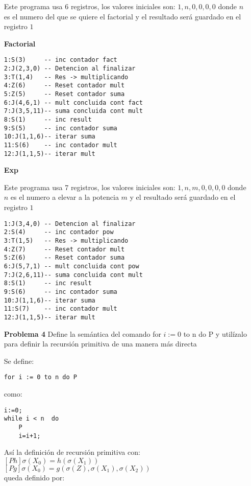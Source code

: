 \documentclass{article}
\begin{document}
\begin{enumerate}
Este programa usa 6 registros, los valores iniciales son:
$1,n,0,0,0,0$ donde $n$ es el numero del que se quiere el factorial y el resultado
será guardado en el registro $1$ \\

\item[\bf{Factorial}]
\begin{lstlisting}[frame=single] 
1:S(3)     -- inc contador fact
2:J(2,3,0) -- Detencion al finalizar
3:T(1,4)   -- Res -> multiplicando
4:Z(6)     -- Reset contador mult
5:Z(5)     -- Reset contador suma
6:J(4,6,1) -- mult concluida cont fact 
7:J(3,5,11)-- suma concluida cont mult
8:S(1)     -- inc result
9:S(5)     -- inc contador suma
10:J(1,1,6)-- iterar suma
11:S(6)    -- inc contador mult
12:J(1,1,5)-- iterar mult
\end{lstlisting}


\item[\bf{Exp}]

Este programa usa 7 registros, los valores iniciales son:
$1,n,m,0,0,0,0$ donde $n$ es el numero a elevar a la potencia $m$ y el resultado
será guardado en el registro $1$ \\

\begin{lstlisting}[frame=single] 
1:J(3,4,0) -- Detencion al finalizar
2:S(4)     -- inc contador pow
3:T(1,5)   -- Res -> multiplicando
4:Z(7)     -- Reset contador mult
5:Z(6)     -- Reset contador suma
6:J(5,7,1) -- mult concluida cont pow
7:J(2,6,11)-- suma concluida cont mult
8:S(1)     -- inc result
9:S(6)     -- inc contador suma
10:J(1,1,6)-- iterar suma
11:S(7)    -- inc contador mult
12:J(1,1,5)-- iterar mult
\end{lstlisting}

\newpage
\item[\bf{Problema 4}]Define la semántica del comando
for $i := 0$ to n do P
y utilízalo para definir la recursión primitiva de una manera más directa

Se define:\\
\begin{lstlisting}[frame=single] 
for i := 0 to n do P
\end{lstlisting}

como:\\
\begin{lstlisting}[frame=single] 
i:=0;              
while i < n  do      
    P
    i=i+1;
\end{lstlisting}

Así la definición de recursión primitiva con: \\
$[Ph]\sigma(X_0) = h(\sigma(X_1))$\\
$[Pg]\sigma(X_0) = g( \sigma(Z),\sigma(X_1),\sigma(X_2))$\\
queda definido por:\\


\end{enumerate}
\end{document}
